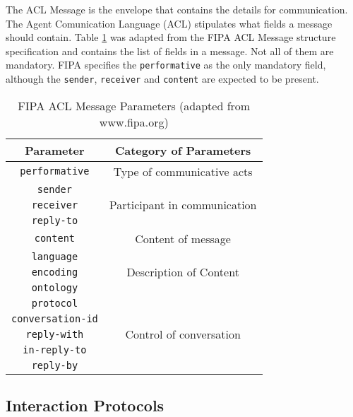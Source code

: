 The ACL Message is the envelope that contains the details for communication. The Agent Comunication Language (ACL) stipulates what fields a message should contain. Table \ref{tab:fipaACLMessage} was adapted from the FIPA ACL Message structure specification and contains the list of fields in a message. Not all of them are mandatory. FIPA specifies the \texttt{performative} as the only mandatory field, although the \texttt{sender}, \texttt{receiver} and \texttt{content} are expected to be present.

\begin{table}
	\normalsize
	\caption[FIPA ACL Message Parameters]
	{FIPA ACL Message Parameters (adapted from www.fipa.org)}
	\label{tab:fipaACLMessage}
	\begin{center}
		\begin{tabular}{c|c}
		\hline
		\textbf{Parameter} & \textbf{Category of Parameters} \\
		\hline
		\texttt{performative} & Type of communicative acts \\
		\hline
		\texttt{sender} & \multirow{3}{*}{Participant in communication} \\
		\cline{1-1}
		\texttt{receiver} \\
		\cline{1-1}
		\texttt{reply-to}  \\
		\hline
		\texttt{content} & Content of message \\
		\hline
		\texttt{language} & \multirow{3}{*}{Description of Content} \\
		\cline{1-1}
		\texttt{encoding} \\
		\cline{1-1}
		\texttt{ontology} \\
		\hline
		\texttt{protocol} & \multirow{5}{*}{Control of conversation} \\
		\cline{1-1}
		\texttt{conversation-id} \\
		\cline{1-1}
		\texttt{reply-with} \\
		\cline{1-1}
		\texttt{in-reply-to} \\
		\cline{1-1}
		\texttt{reply-by} \\
		\hline
		\end{tabular}
	\end{center}
\end{table} 

\subsection{Interaction Protocols}

